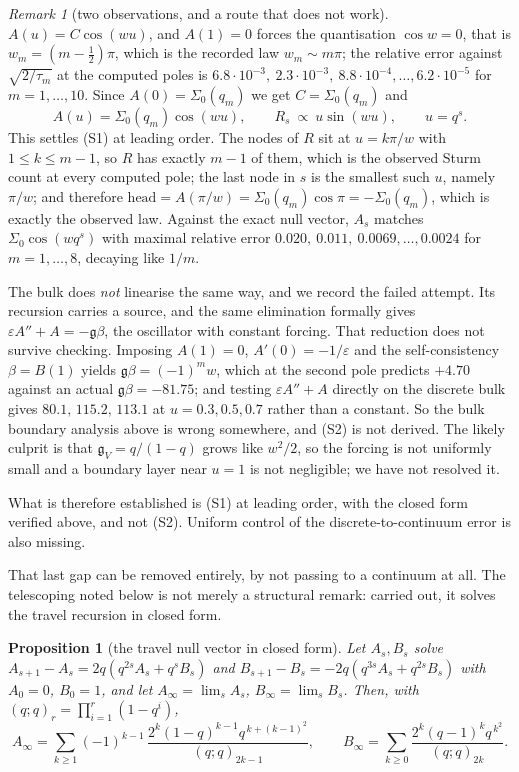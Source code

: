 \documentclass[11pt]{article}
\newtheorem{proposition}[theorem]{Proposition}
\theoremstyle{definition}
\theoremstyle{remark}
\newtheorem{remark}[theorem]{Remark}
\theoremstyle{definition}
\begin{document}
\begin{remark}[two observations, and a route that does not work]
$A(u)=C\cos(wu)$, and $A(1)=0$ forces the quantisation $\cos w=0$, that is
$w_m=(m-\tfrac12)\pi$, which is the recorded law $w_m\sim m\pi$; the relative error against
$\sqrt{2/\tau_m}$ at the computed poles is
$6.8\cdot10^{-3},\ 2.3\cdot10^{-3},\ 8.8\cdot10^{-4},\dots,6.2\cdot10^{-5}$ for $m=1,\dots,10$.
Since $A(0)=\Sigma_0(q_m)$ we get $C=\Sigma_0(q_m)$ and
\[
   A(u)=\Sigma_0(q_m)\cos(wu),\qquad R_s\ \propto\ u\sin(wu),\qquad u=q^s .
\]
This settles \textup{(S1)} at leading order. The nodes of $R$ sit at $u=k\pi/w$ with
$1\le k\le m-1$, so $R$ has exactly $m-1$ of them, which is the observed Sturm count at every
computed pole; the last node in $s$ is the smallest such $u$, namely $\pi/w$; and therefore
$\text{head}=A(\pi/w)=\Sigma_0(q_m)\cos\pi=-\Sigma_0(q_m)$, which is exactly the observed law.
Against the exact null vector, $A_s$ matches $\Sigma_0\cos(wq^s)$ with maximal relative error
$0.020,\ 0.011,\ 0.0069,\dots,0.0024$ for $m=1,\dots,8$, decaying like $1/m$.

The bulk does \emph{not} linearise the same way, and we record the failed attempt. Its recursion
carries a source, and the same elimination formally gives $\varepsilon A''+A=-\mathfrak g\beta$,
the oscillator with constant forcing. That reduction does not survive checking. Imposing
$A(1)=0$, $A'(0)=-1/\varepsilon$ and the self-consistency $\beta=B(1)$ yields
$\mathfrak g\beta=(-1)^mw$, which at the second pole predicts $+4.70$ against an actual
$\mathfrak g\beta=-81.75$; and testing $\varepsilon A''+A$ directly on the discrete bulk gives
$80.1,\,115.2,\,113.1$ at $u=0.3,0.5,0.7$ rather than a constant. So the bulk boundary analysis
above is wrong somewhere, and \textup{(S2)} is not derived. The likely culprit is that
$\mathfrak g_V=q/(1-q)$ grows like $w^2/2$, so the forcing is not uniformly small and a boundary
layer near $u=1$ is not negligible; we have not resolved it.

What is therefore established is \textup{(S1)} at leading order, with the closed form verified
above, and not \textup{(S2)}. Uniform control of the discrete-to-continuum error is also missing.

That last gap can be removed entirely, by not passing to a continuum at all. The telescoping noted
below is not merely a structural remark: carried out, it solves the travel recursion in closed
form.

\begin{proposition}[the travel null vector in closed form]\label{prop:travelexact}
Let $A_s,B_s$ solve $A_{s+1}-A_s=2q(q^{2s}A_s+q^sB_s)$ and
$B_{s+1}-B_s=-2q(q^{3s}A_s+q^{2s}B_s)$ with $A_0=0$, $B_0=1$, and let
$A_\infty=\lim_s A_s$, $B_\infty=\lim_s B_s$. Then, with $(q;q)_r=\prod_{i=1}^r(1-q^i)$,
\[
  A_\infty=\sum_{k\ge1}(-1)^{k-1}\,\frac{2^k(1-q)^{k-1}q^{\,k+(k-1)^2}}{(q;q)_{2k-1}},
  \qquad
  B_\infty=\sum_{k\ge0}\frac{2^k(q-1)^kq^{\,k^2}}{(q;q)_{2k}} .
\]
\end{proposition}


\end{remark}
\end{document}
